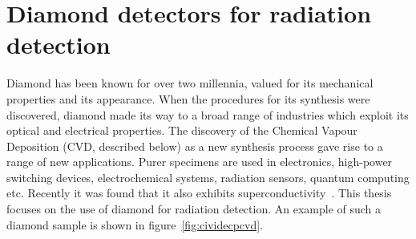 
\chapter{Diamond detectors for radiation detection}
\label{ch:diamond}

%
%

Diamond has been known for over two millennia, valued for its mechanical properties and its appearance. When the procedures for its synthesis were discovered, diamond made its way to a broad range of industries which exploit its optical and electrical properties. The discovery of the Chemical Vapour Deposition (CVD, described below) as a new synthesis process gave rise to a range of new applications. Purer specimens are used in electronics, high-power switching devices, electrochemical systems, radiation sensors, quantum computing etc. Recently it was found that it also exhibits superconductivity~\cite{DIAMS:00000}. This thesis focuses on the use of diamond for radiation detection. An example of such a diamond sample is shown in figure~\ref{fig:cividecpcvd}.


